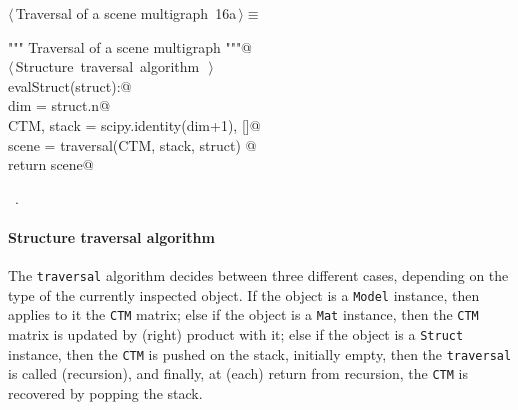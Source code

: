 \documentclass[11pt,oneside]{article}	%
\begin{document}
\begin{flushleft} \small \label{scrap29}
\protect{}$\langle\,$Traversal of a scene multigraph\nobreak\ {\footnotesize 16a}$\,\rangle\equiv$
\vspace{-1ex}
\begin{list}{}{} \item
\mbox{}\verb@""" Traversal of a scene multigraph """@\\
\mbox{}\verb@@\hbox{$\langle\,$Structure traversal algorithm\nobreak\ {\footnotesize {}}$\,\rangle$}\verb@@\\
\mbox{}\verb@def evalStruct(struct):@\\
\mbox{}\verb@    dim = struct.n@\\
\mbox{}\verb@    CTM, stack = scipy.identity(dim+1), []@\\
\mbox{}\verb@    scene = traversal(CTM, stack, struct) @\\
\mbox{}\verb@    return scene@\\
\mbox{}\verb@@{\NWsep}
\end{list}
\vspace{-1ex}
\footnotesize\addtolength{\baselineskip}{-1ex}
\begin{list}{}{\setlength{\itemsep}{-\parsep}\setlength{\itemindent}{-\leftmargin}}
\item \NWtxtMacroRefIn\ .
\end{list}
\end{flushleft}

\paragraph{Structure traversal algorithm}

The \texttt{traversal} algorithm decides between three different cases, depending on the type of the currently inspected object. If the object is a \texttt{Model} instance, then applies to it the \texttt{CTM} matrix; else if the object is a \texttt{Mat} instance, then the \texttt{CTM} matrix is updated by (right) product with it; else if the object is a \texttt{Struct} instance, then the \texttt{CTM} is pushed on the stack, initially empty, then the \texttt{traversal} is called (recursion), and finally, at (each) return from recursion, the \texttt{CTM} is recovered by popping the stack.
\end{document}
